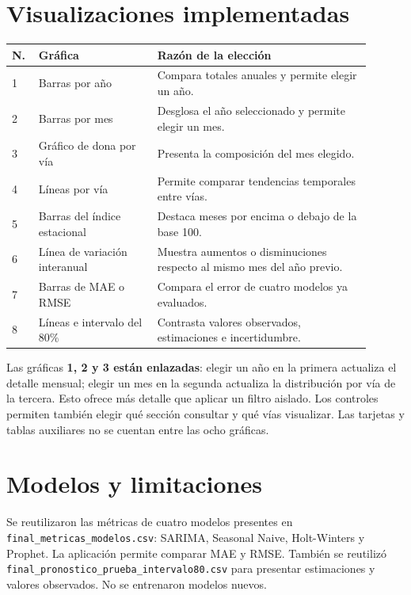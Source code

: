 \documentclass[11pt,letterpaper]{article}
\begin{document}
\section{Visualizaciones implementadas}
\begin{center}\small
\begin{tabular}{@{}p{0.06\linewidth}p{0.30\linewidth}p{0.54\linewidth}@{}}\toprule
N. & Gráfica & Razón de la elección \\ \midrule
1 & Barras por año & Compara totales anuales y permite elegir un año.\\
2 & Barras por mes & Desglosa el año seleccionado y permite elegir un mes.\\
3 & Gráfico de dona por vía & Presenta la composición del mes elegido.\\
4 & Líneas por vía & Permite comparar tendencias temporales entre vías.\\
5 & Barras del índice estacional & Destaca meses por encima o debajo de la base 100.\\
6 & Línea de variación interanual & Muestra aumentos o disminuciones respecto al mismo mes del año previo.\\
7 & Barras de MAE o RMSE & Compara el error de cuatro modelos ya evaluados.\\
8 & Líneas e intervalo del 80\% & Contrasta valores observados, estimaciones e incertidumbre.\\ \bottomrule
\end{tabular}
\end{center}

Las gráficas \textbf{1, 2 y 3 están enlazadas}: elegir un año en la primera actualiza el detalle mensual; elegir un mes en la segunda actualiza la distribución por vía de la tercera. Esto ofrece más detalle que aplicar un filtro aislado. Los controles permiten también elegir qué sección consultar y qué vías visualizar. Las tarjetas y tablas auxiliares no se cuentan entre las ocho gráficas.

\section{Modelos y limitaciones}
Se reutilizaron las métricas de cuatro modelos presentes en \texttt{final\_metricas\_modelos.csv}: SARIMA, Seasonal Naive, Holt-Winters y Prophet. La aplicación permite comparar MAE y RMSE. También se reutilizó \texttt{final\_pronostico\_prueba\_intervalo80.csv} para presentar estimaciones y valores observados. No se entrenaron modelos nuevos.
\end{document}
